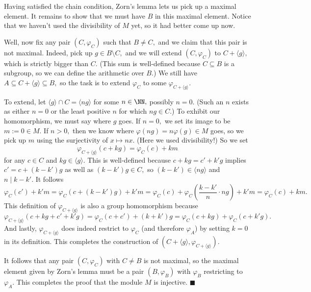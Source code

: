 Having satisfied the chain condition, Zorn's lemma lets us pick up a maximal element. It remains to show that we must have $B$ in this maximal element. Notice that we haven't used the divisibility of $M$ yet, so it had better come up now.

Well, now fix any pair $(C,\varphi_C)$ such that $B\ne C,$ and we claim that this pair is not maximal. Indeed, pick up $g\in B\setminus C,$ and we will extend $(C,\varphi_C)$ to $C+\langle g\rangle,$ which is strictly bigger than $C.$ (This sum is well-defined because $C\subseteq B$ is a subgroup, so we can define the arithmetic over $B.$) We still have $A\subseteq C+\langle g\rangle\subseteq B,$ so the task is to extend $\varphi_C$ to some $\varphi_{C+\langle g\rangle}.$

To extend, let $\langle g\rangle\cap C=\langle ng\rangle$ for some $n\in\NN,$ possibly $n=0.$ (Such an $n$ exists as either $n=0$ or the least positive $n$ for which $ng\in C.$) To exhibit our homomorphism, we must say where $g$ goes. If $n=0,$ we set its image to be $m:=0\in M.$ If $n>0,$ then we know where $\varphi(ng)=n\varphi(g)\in M$ goes, so we pick up $m$ using the surjectivity of $x\mapsto nx.$ (Here we used divisibility!) So we set
\[\varphi_{C+\langle g\rangle}(c+kg)=\varphi_C(c)+km\]
for any $c\in C$ and $kg\in\langle g\rangle.$ This is well-defined because $c+kg=c'+k'g$ implies $c'=c+(k-k')g$ as well as $(k-k')g\in C,$ so $(k-k')\in\langle ng\rangle$ and $n\mid k-k'.$ It follows
\[\varphi_C(c')+k'm=\varphi_C(c+(k-k')g)+k'm=\varphi_C(c)+\varphi_C\left(\frac{k-k'}n\cdot ng\right)+k'm=\varphi_C(c)+km.\]
This definition of $\varphi_{C+\langle g\rangle}$ is also a group homomorphism because
\[\varphi_{C+\langle g\rangle}(c+kg+c'+k'g)=\varphi_C(c+c')+(k+k')g=\varphi_C(c+kg)+\varphi_C(c+k'g).\]
And lastly, $\varphi_{C+\langle g\rangle}$ does indeed restrict to $\varphi_C$ (and therefore $\varphi_A$) by setting $k=0$ in its definition. This completes the construction of $(C+\langle g\rangle,\varphi_{C+\langle g\rangle}).$

It follows that any pair $(C,\varphi_C)$ with $C\ne B$ is not maximal, so the maximal element given by Zorn's lemma must be a pair $(B,\varphi_B)$ with $\varphi_B$ restricting to $\varphi_A.$ This completes the proof that the module $M$ is injective. $\blacksquare$

